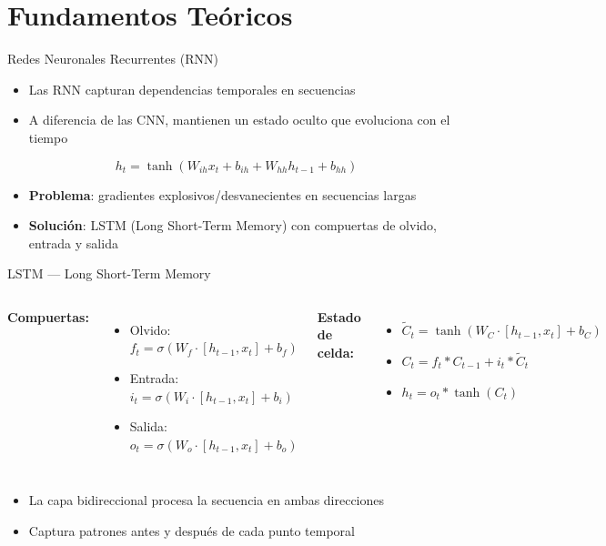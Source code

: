 \documentclass[10pt]{beamer}
\begin{document}
\section{Fundamentos Teóricos}

\begin{frame}{Redes Neuronales Recurrentes (RNN)}
  \begin{itemize}
    \item Las RNN capturan dependencias temporales en secuencias
    \item A diferencia de las CNN, mantienen un estado oculto que evoluciona con el tiempo
  \end{itemize}

  \begin{equation*}
    h_t = \tanh(W_{ih} x_t + b_{ih} + W_{hh} h_{t-1} + b_{hh})
  \end{equation*}

  \begin{itemize}
    \item \textbf{Problema}: gradientes explosivos/desvanecientes en secuencias largas
    \item \textbf{Solución}: LSTM (Long Short-Term Memory) con compuertas de olvido, entrada y salida
  \end{itemize}
\end{frame}

\begin{frame}{LSTM — Long Short-Term Memory}
  \begin{columns}[T]
    \textbf{Compuertas:}
    \begin{itemize}
      \item Olvido: $f_t = \sigma(W_f \cdot [h_{t-1}, x_t] + b_f)$
      \item Entrada: $i_t = \sigma(W_i \cdot [h_{t-1}, x_t] + b_i)$
      \item Salida: $o_t = \sigma(W_o \cdot [h_{t-1}, x_t] + b_o)$
    \end{itemize}
    
    \textbf{Estado de celda:}
    \begin{itemize}
      \item $\tilde{C}_t = \tanh(W_C \cdot [h_{t-1}, x_t] + b_C)$
      \item $C_t = f_t * C_{t-1} + i_t * \tilde{C}_t$
      \item $h_t = o_t * \tanh(C_t)$
    \end{itemize}
  \end{columns}
  \vspace{0.3cm}
  \begin{itemize}
    \item La capa bidireccional procesa la secuencia en ambas direcciones
    \item Captura patrones antes y después de cada punto temporal
  \end{itemize}
\end{frame}
\end{document}
